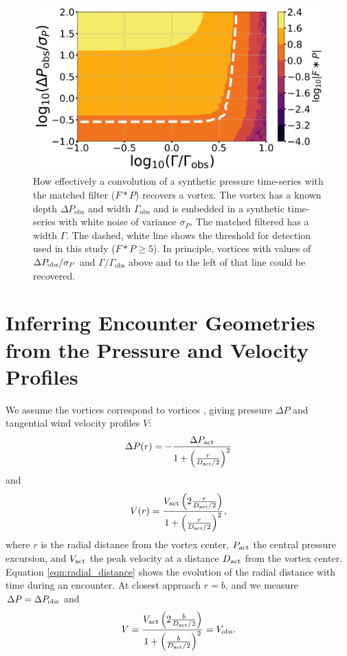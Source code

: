 \documentclass[linenumbers,trackchanges]{aastex63}
\begin{document}
\begin{figure}
    \centering
    \includegraphics[width=\textwidth]{figures/vortex_recovery.png}
    \caption{How effectively a convolution of a synthetic pressure time-series with the matched filter ($F \ast P$) recovers a vortex. The vortex has a known depth $\Delta P_\text{obs}$ and width $\Gamma_\text{obs}$ and is embedded in a synthetic time-series with white noise of variance $\sigma_P$. The matched filtered has a width $\Gamma$. The dashed, white line shows the threshold for detection used in this study ($F \ast P \geq 5$). In principle, vortices with values of $\Delta P_{\rm obs}/\sigma_P$ and $\Gamma/\Gamma_\text{obs}$ above and to the left of that line could be recovered.}
    \label{fig:vortex_recovery}
\end{figure}

\section{Inferring Encounter Geometries from the Pressure and Velocity Profiles}
\label{sec:Inferring Encounter Geometries from the Pressure and Velocity Profiles}
We assume the vortices correspond to  vortices \citep{1991ExFl...11...73V}, giving pressure $\Delta P$ and tangential wind velocity profiles $V$:
\begin{equation}
    \Delta P(r) = -\frac{\Delta P_{\rm act}}{1 + \left( \frac{r}{D_{\rm act}/2} \right)^2}\label{eqn:radial_lorentzian_profile}
\end{equation}
and
\begin{equation}
    V(r) = \frac{ V_{\rm act} \left( 2 \frac{r}{D_{\rm act}/2} \right)}{1 + \left( \frac{r}{D_{\rm act}/2} \right)^2},\label{eqn:radial_wind_profile}
\end{equation}
where $r$ is the radial distance from the vortex center, $P_{\rm act}$ the central pressure excursion, and $V_{\rm act}$ the peak velocity at a distance $D_{\rm act}$ from the vortex center. Equation \ref{eqn:radial_distance} shows the evolution of the radial distance with time during an encounter. At closest approach $r = b$, and we measure $\Delta P = \Delta P_{\rm obs}$ and 
\begin{equation}
    V = \frac{ V_{\rm act} \left( 2\frac{b}{D_{\rm act}/2} \right)}{1 + \left( \frac{b}{D_{\rm act}/2} \right)^2} = V_{\rm obs}.\label{eqn:Vobs}
\end{equation} 
\end{document}
